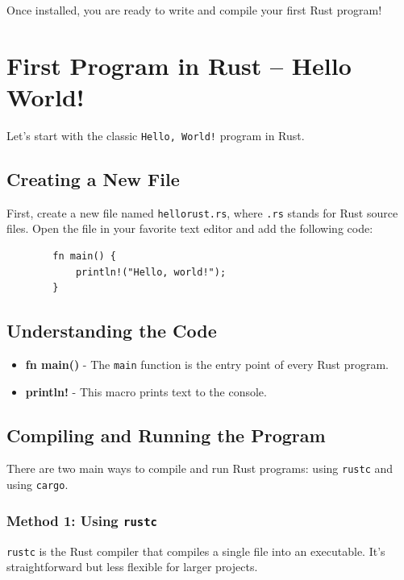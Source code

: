 \documentclass[a4paper,12pt]{report}
\begin{document}
	Once installed, you are ready to write and compile your first Rust program!
	
	\section*{First Program in Rust -- Hello World!}
	Let's start with the classic \texttt{Hello, World!} program in Rust.
	
	\subsection*{Creating a New File}
	First, create a new file named \texttt{hellorust.rs}, where \texttt{.rs} stands for Rust source files. Open the file in your favorite text editor and add the following code:
	
	\begin{lstlisting}
		fn main() {
			println!("Hello, world!");
		}
	\end{lstlisting}
	
	\subsection*{Understanding the Code}
	\begin{itemize}
		\item \textbf{fn main()} - The \texttt{main} function is the entry point of every Rust program.
		\item \textbf{println!} - This macro prints text to the console.
	\end{itemize}
	
	\subsection*{Compiling and Running the Program}
	There are two main ways to compile and run Rust programs: using \texttt{rustc} and using \texttt{cargo}. 
	
	\subsubsection*{Method 1: Using \texttt{rustc}}
	\texttt{rustc} is the Rust compiler that compiles a single file into an executable. It’s straightforward but less flexible for larger projects.
	
\end{document}
